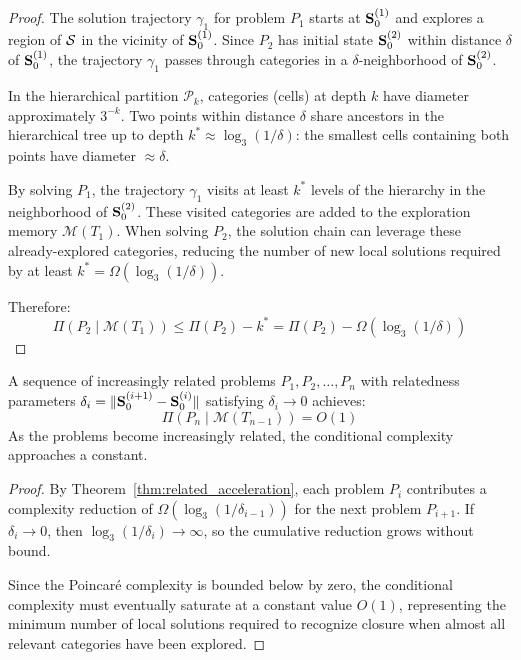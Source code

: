 \begin{proof}
The solution trajectory $\gamma_1$ for problem $P_1$ starts at $\mathbf{S}_0^{(1)}$ and explores a region of $\mathcal{S}$ in the vicinity of $\mathbf{S}_0^{(1)}$. Since $P_2$ has initial state $\mathbf{S}_0^{(2)}$ within distance $\delta$ of $\mathbf{S}_0^{(1)}$, the trajectory $\gamma_1$ passes through categories in a $\delta$-neighborhood of $\mathbf{S}_0^{(2)}$.

In the hierarchical partition $\mathcal{P}_k$, categories (cells) at depth $k$ have diameter approximately $3^{-k}$. Two points within distance $\delta$ share ancestors in the hierarchical tree up to depth $k^* \approx \log_3(1/\delta)$: the smallest cells containing both points have diameter $\approx \delta$.

By solving $P_1$, the trajectory $\gamma_1$ visits at least $k^*$ levels of the hierarchy in the neighborhood of $\mathbf{S}_0^{(2)}$. These visited categories are added to the exploration memory $\mathcal{M}(T_1)$. When solving $P_2$, the solution chain can leverage these already-explored categories, reducing the number of new local solutions required by at least $k^* = \Omega(\log_3(1/\delta))$.

Therefore:
\begin{equation}
\Pi(P_2 \mid \mathcal{M}(T_1)) \leq \Pi(P_2) - k^* = \Pi(P_2) - \Omega(\log_3(1/\delta))
\end{equation}
\end{proof}

\begin{corollary}
\label{cor:progressive_refinement}
A sequence of increasingly related problems $P_1, P_2, \ldots, P_n$ with relatedness parameters $\delta_i = \|\mathbf{S}_0^{(i+1)} - \mathbf{S}_0^{(i)}\|$ satisfying $\delta_i \to 0$ achieves:
\begin{equation}
\Pi(P_n \mid \mathcal{M}(T_{n-1})) = O(1)
\label{eq:progressive_refinement}
\end{equation}
As the problems become increasingly related, the conditional complexity approaches a constant.
\end{corollary}

\begin{proof}
By Theorem~\ref{thm:related_acceleration}, each problem $P_i$ contributes a complexity reduction of $\Omega(\log_3(1/\delta_{i-1}))$ for the next problem $P_{i+1}$. If $\delta_i \to 0$, then $\log_3(1/\delta_i) \to \infty$, so the cumulative reduction grows without bound.

Since the Poincaré complexity is bounded below by zero, the conditional complexity must eventually saturate at a constant value $O(1)$, representing the minimum number of local solutions required to recognize closure when almost all relevant categories have been explored.
\end{proof}

